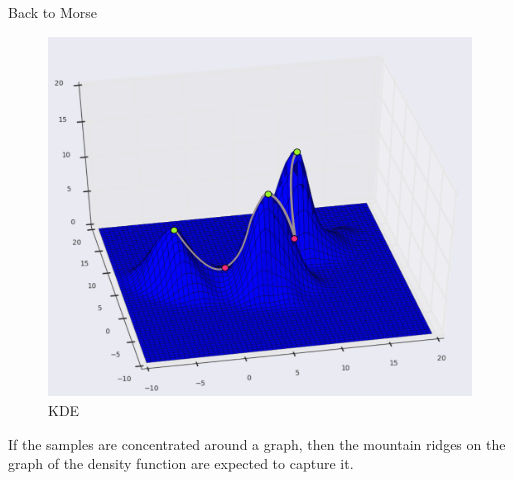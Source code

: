 \documentclass[9pt,sans-serif]{beamer}
\begin{document}
\begin{frame}{Back to Morse}
  \begin{figure}[htb]
    \centering \includegraphics[scale=0.27]{ridges}
    \caption{KDE}
  \end{figure}

  \begin{block}{}
    If the samples are concentrated around a graph, then the mountain ridges on
    the graph of the density function are expected to capture it.
  \end{block}
\end{frame}
\end{document}
